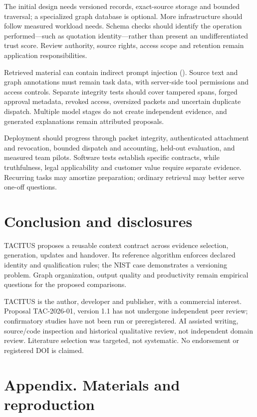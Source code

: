 \documentclass[
  11pt,
]{article}
\let\originalsection\section
\renewcommand{\section}{\Needspace{5\baselineskip}\originalsection}
\begin{document}
The initial design needs versioned records, exact-source storage and
bounded traversal; a specialized graph database is optional. More
infrastructure should follow measured workload needs. Schema checks
should identify the operation performed---such as quotation
identity---rather than present an undifferentiated trust score. Review
authority, source rights, access scope and retention remain application
responsibilities.

Retrieved material can contain indirect prompt injection
(). Source text and
graph annotations must remain task data, with server-side tool
permissions and access controls. Separate integrity tests should cover
tampered spans, forged approval metadata, revoked access, oversized
packets and uncertain duplicate dispatch. Multiple model stages do not
create independent evidence, and generated explanations remain
attributed proposals.

Deployment should progress through packet integrity, authenticated
attachment and revocation, bounded dispatch and accounting, held-out
evaluation, and measured team pilots. Software tests establish specific
contracts, while truthfulness, legal applicability and customer value
require separate evidence. Recurring tasks may amortize preparation;
ordinary retrieval may better serve one-off questions.

\section{Conclusion and disclosures}\label{conclusion-and-disclosures}

TACITUS proposes a reusable context contract across evidence selection,
generation, updates and handover. Its reference algorithm enforces
declared identity and qualification rules; the NIST case demonstrates a
versioning problem. Graph organization, output quality and productivity
remain empirical questions for the proposed comparisons.

TACITUS is the author, developer and publisher, with a commercial
interest. Proposal TAC-2026-01, version 1.1 has not undergone
independent peer review; confirmatory studies have not been run or
preregistered. AI assisted writing, source/code inspection and
historical qualitative review, not independent domain review. Literature
selection was targeted, not systematic. No endorsement or registered DOI
is claimed.

\section*{Appendix. Materials and
reproduction}\label{appendix.-materials-and-reproduction}
\end{document}
